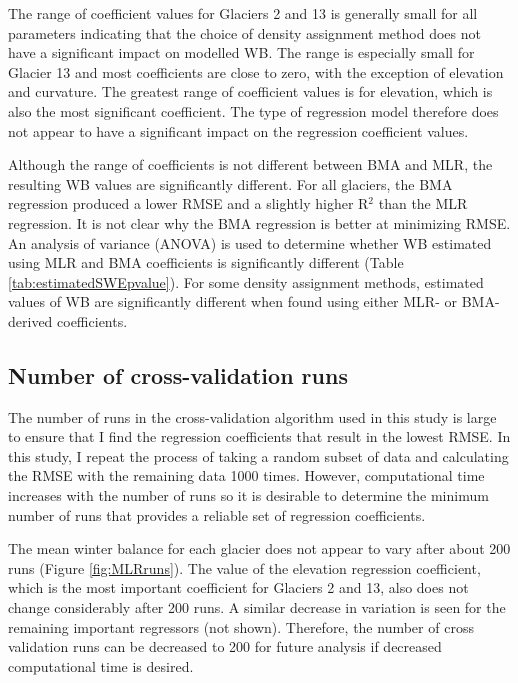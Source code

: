 \documentclass{sfuthesis}
\begin{document}
{The range of coefficient values for Glaciers 2 and 13 is generally small for all parameters indicating that the choice of density assignment method does not have a significant impact on modelled WB. The range is especially small for Glacier 13 and most coefficients are close to zero, with the exception of elevation and curvature. The greatest range of coefficient values is for elevation, which is also the most significant coefficient. The type of regression model therefore does not appear to have a significant impact on the regression coefficient values.

Although the range of coefficients is not different between BMA and MLR, the resulting WB values are significantly different. For all glaciers, the BMA regression produced a lower RMSE and a slightly higher R$^2$ than the MLR regression. It is not clear why the BMA regression is better at minimizing RMSE. An analysis of variance (ANOVA) is used to determine whether WB estimated using MLR and BMA coefficients is significantly different (Table \ref{tab:estimatedSWEpvalue}). For some density assignment methods, estimated values of WB are significantly different when found using either MLR- or BMA-derived coefficients. 

\subsection{Number of cross-validation runs}

The number of runs in the cross-validation algorithm used in this study is large to ensure that I find the regression coefficients that result in the lowest RMSE. In this study, I repeat the process of taking a random subset of data and calculating the RMSE with the remaining data 1000 times.  However, computational time increases with the number of runs so it is desirable to determine the minimum number of runs that provides a reliable set of regression coefficients. 

The mean winter balance for each glacier does not appear to vary after about 200 runs (Figure \ref{fig:MLRruns}). The value of the elevation regression coefficient, which is the most important coefficient for Glaciers 2 and 13, also does not change considerably after 200 runs. A similar decrease in variation is seen for the remaining important regressors (not shown). Therefore, the number of cross validation runs can be decreased to 200 for future analysis if decreased computational time is desired. 


}
\end{document}
